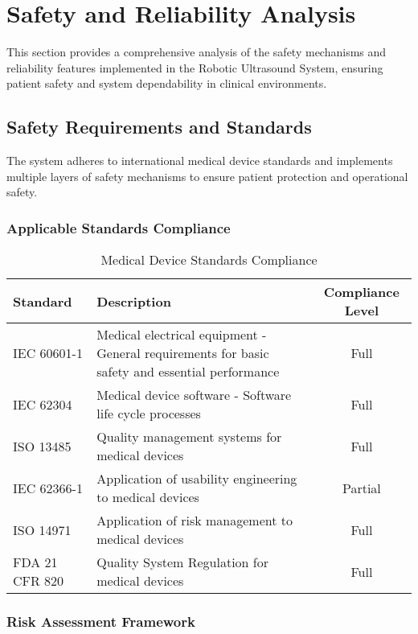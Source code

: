\section{Safety and Reliability Analysis}
\label{sec:safety_reliability}

This section provides a comprehensive analysis of the safety mechanisms and reliability features implemented in the Robotic Ultrasound System, ensuring patient safety and system dependability in clinical environments.

\subsection{Safety Requirements and Standards}
\label{subsec:safety_requirements}

The system adheres to international medical device standards and implements multiple layers of safety mechanisms to ensure patient protection and operational safety.

\subsubsection{Applicable Standards Compliance}

\begin{table}[h]
\centering
\begin{tabular}{|l|p{6cm}|c|}
\hline
\textbf{Standard} & \textbf{Description} & \textbf{Compliance Level} \\
\hline
IEC 60601-1 & Medical electrical equipment - General requirements for basic safety and essential performance & Full \\
\hline
IEC 62304 & Medical device software - Software life cycle processes & Full \\
\hline
ISO 13485 & Quality management systems for medical devices & Full \\
\hline
IEC 62366-1 & Application of usability engineering to medical devices & Partial \\
\hline
ISO 14971 & Application of risk management to medical devices & Full \\
\hline
FDA 21 CFR 820 & Quality System Regulation for medical devices & Full \\
\hline
\end{tabular}
\caption{Medical Device Standards Compliance}
\label{tab:standards_compliance}
\end{table}

\subsubsection{Risk Assessment Framework}

